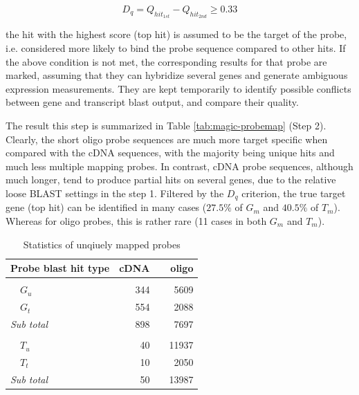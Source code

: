 \begin{equation}
D_q = Q_{hit_{1st}} - Q_{hit_{2nd}} \geq 0.33
\end{equation}

the hit with the highest score (top hit) is assumed to be the target of the 
probe, i.e. considered more likely to bind the probe sequence compared to other 
hits. 
If the above condition is not met, the corresponding results for that 
probe are marked, assuming that they can hybridize several genes and generate 
ambiguous expression measurements. 
They are kept temporarily to identify possible conflicts between gene and 
transcript blast output, and compare their quality. 

The result this step is summarized in Table \ref{tab:magic-probemap} (Step 2). 
Clearly, the short oligo probe sequences are much more target specific when 
compared with the cDNA sequences, with the majority being unique hits and much 
less multiple mapping probes.
In contrast, cDNA probe sequences, although much longer, tend to produce 
partial hits on several genes, due to the relative loose BLAST settings in the 
step 1. 
Filtered by the $D_q$ criterion, the true target gene (top hit) can be 
identified in many cases ($27.5\%$ of $G_m$ and $40.5\%$ of $T_m$).
Whereas for oligo probes, this is rather rare (11 cases in both $G_m$ and 
$T_m$).


\begin{table}[tb]
	\centering
	\begin{threeparttable}
	\begin{footnotesize}
	\caption{Statistics of unqiuely mapped probes} 
	\label{tab:magic-uniquemaps}
	\begin{tabular}{@{}>{\centering\arraybackslash}p{5cm}rcr}
	\toprule
	 \textbf{Probe blast hit type} & \textbf{cDNA} & \phantom{a} & 
	 \textbf{oligo} \\
	\midrule
	
	\multicolumn{4}{l}{\textit{Gene blast}} \\
	~~$G_u$ & 344 && 5609 \\
	~~$G_t$ & 554 && 2088 \\
	\textit{Sub total} & 898 && 7697 \\[1.5ex]

	\multicolumn{4}{l}{\textit{Transcript blast}} \\
	~~$T_u$ & 40 && 11937 \\
	~~$T_t$ & 10 && 2050 \\
	\textit{Sub total} & 50 && 13987 \\

	\bottomrule
	\end{tabular}
	\end{footnotesize}
	\end{threeparttable}
\end{table}


